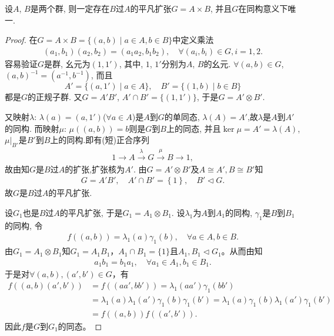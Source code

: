 \documentclass[../../main.tex]{subfiles}%
\begin{document}
\begin{theorem}\label{theorem:抽象代数--定理4.5.4}
设$A$, $B$是两个群, 则一定存在$B$过$A$的平凡扩张$G=A\times B$, 并且$G$在同构意义下唯一.
\end{theorem}
\begin{proof}
在$G = A\times B = \{(a, b)\mid a\in A, b\in B\}$中定义乘法
\begin{align*}
(a_1, b_1)(a_2, b_2) = (a_1a_2, b_1b_2),\quad \forall (a_i, b_i)\in G, i = 1, 2.
\end{align*}
容易验证$G$是群, 幺元为$(1, 1')$, 其中, $1$, $1'$分别为$A$, $B$的幺元. $\forall (a, b)\in G$, $(a, b)^{-1} = (a^{-1}, b^{-1})$, 而且
$$
A' = \{(a, 1')\mid a\in A\},\quad B' = \{(1, b)\mid b\in B\}
$$
都是$G$的正规子群. 又$G = A'B'$, $A'\cap B' = \{(1, 1')\}$, 于是$G = A'\otimes B'$. 

又映射$\lambda$: $\lambda(a) = (a, 1')$($\forall a\in A$)是$A$到$G$的单同态, $\lambda(A) = A'$,故$\lambda$是$A$到$A'$的同构. 而映射$\mu$: $\mu((a, b)) = b$则是$G$到$B$上的同态, 并且$\ker\mu = A'=\lambda(A)$, $\mu|_{B'}$是$B'$到$B$上的同构.即有(短)正合序列
\begin{align*}
1\longrightarrow A \stackrel{\lambda}{\longrightarrow} G \stackrel{\mu}{\longrightarrow} B\longrightarrow 1,
\end{align*}
故由知$G$是$B$过$A$的扩张,扩张核为$A'$.
由$G = A'\otimes B'$及$A\cong A' ,B\cong B'$知
\begin{align*}
G=A'B',\quad A' \cap B' =\left\{ 1 \right\},\quad B'\lhd G.
\end{align*}
故$G$是$B$过$A$的平凡扩张.

设$G_1$也是$B$过$A$的平凡扩张, 于是$G_1 = A_1\otimes B_1$. 设$\lambda_1$为$A$到$A_1$的同构, $\gamma_1$是$B$到$B_1$的同构, 令
\begin{align*}
f((a, b)) = \lambda_1(a)\gamma_1(b),\quad \forall a\in A, b\in B.
\end{align*}
由$G_1=A_1\otimes B_1$知$G_1=A_1B_1$，$A_1\cap B_1=\{1\}$且$A_1,B_1\lhd G_1$。从而由知
\begin{align*}
a_1b_1=b_1a_1,\quad \forall a_1\in A_1,b_1\in B_1.
\end{align*}
于是对$\forall (a,b),(a',b')\in G$，有
\begin{align*}
f((a,b)(a',b'))&=f((aa',bb'))=\lambda_1(aa')\gamma_1(bb') \\
&=\lambda_1(a)\lambda_1(a')\gamma_1(b)\gamma_1(b')=\lambda_1(a)\gamma_1(b)\lambda_1(a')\gamma_1(b') \\
&=f((a,b))f((a',b')).
\end{align*}
因此$f$是$G$到$G_1$的同态。


\end{proof}
\end{document}
